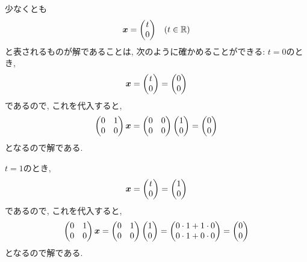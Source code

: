 \begin{checkanswer}%
  少なくとも
  \begin{align*}
    \boldsymbol{x}=\begin{pmatrix}t\\0\end{pmatrix}&&(t\in\mathbb{R})
  \end{align*}
  と表されるものが解であることは,
  次のように確かめることができる:
  $t=0$のとき,
  \begin{align*}
    \boldsymbol{x}=\begin{pmatrix}t\\0\end{pmatrix}=\begin{pmatrix}0\\0\end{pmatrix}
  \end{align*}
  であるので, これを代入すると,
  \begin{align*}
     \begin{pmatrix}0&1\\0&0\end{pmatrix}
      \boldsymbol{x}=
      \begin{pmatrix}0&0\\0&0\end{pmatrix}
        \begin{pmatrix}1\\0\end{pmatrix}
      = \begin{pmatrix}0\\0\end{pmatrix}  
  \end{align*}
  となるので解である.

  $t=1$のとき,
  \begin{align*}
    \boldsymbol{x}=\begin{pmatrix}t\\0\end{pmatrix}=\begin{pmatrix}1\\0\end{pmatrix}
  \end{align*}
  であるので, これを代入すると,
  \begin{align*}
     \begin{pmatrix}0&1\\0&0\end{pmatrix}
      \boldsymbol{x}=
      \begin{pmatrix}0&1\\0&0\end{pmatrix}
        \begin{pmatrix}1\\0\end{pmatrix}
      = \begin{pmatrix}0\cdot 1+1\cdot 0\\0\cdot 1+0\cdot 0\end{pmatrix}  
      = \begin{pmatrix}0\\0\end{pmatrix}  
  \end{align*}
  となるので解である.
\end{checkanswer}
